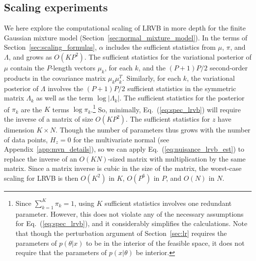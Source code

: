 \documentclass{article}\usepackage[]{graphicx}\usepackage[]{color}
\newcommand{\app}[1]{Appendix~\ref{app:#1}}
\newcommand{\mysec}[1]{Section~\ref{sec:#1}}
\newcommand{\eq}[1]{Eq.~(\ref{eq:#1})}
\begin{document}
\subsection{Scaling experiments} \label{sec:gmm_scaling}



We here explore the computational scaling of LRVB in more depth
for the finite Gaussian mixture model (\mysec{normal_mixture_model}).
In the terms of \mysec{scaling_formulas}, $\alpha$
includes the sufficient statistics from $\mu$, $\pi$, and $\Lambda$,
and grows as $O(KP^2)$.
The sufficient statistics for the variational posterior of
$\mu$ contain the $P$-length vectors $\mu_k$, for each
$k$, and the $(P + 1) P / 2$ second-order products
in the covariance matrix $\mu_k \mu_k^T$.  Similarly, for each $k$,
the variational posterior of $\Lambda$ involves the
$(P + 1) P / 2$ sufficient statistics in the symmetric matrix
$\Lambda_k$ as well as the term $\log |\Lambda_k|$.  The
sufficient statistics for the posterior of $\pi_k$ are the $K$
terms $\log \pi_k$.\footnote{Since $\sum_{k=1}^{K} \pi_k = 1$, using $K$
sufficient statistics involves one redundant parameter.
However, this does not violate any of the necessary assumptions
for \eq{spec_lrvb}, and it considerably simplifies the calculations.
Note that though the perturbation argument of \mysec{lr}
requires the parameters of
$p(\theta | x)$ to be in the interior of the feasible space,
it does not require that the parameters of $p(x | \theta)$
be interior.}
So, minimally, \eq{spec_lrvb}
will require the inverse of a matrix of size $O(KP^2)$.
%
The sufficient statistics for
$z$ have dimension $K \times N$.  Though
the number of parameters thus grows with the number of
data points, $H_{z}=0$ for the multivariate normal
(see \app{mvn_details}),
so we can apply \eq{nuisance_lrvb_est} to replace the
inverse of an $O(KN)$-sized matrix with multiplication by the same matrix.
%
Since a matrix inverse is cubic in the size of the matrix,
the worst-case scaling for LRVB is then $O(K^2)$ in $K$,
$O(P^6)$ in $P$, and $O(N)$ in $N$.
\end{document}
